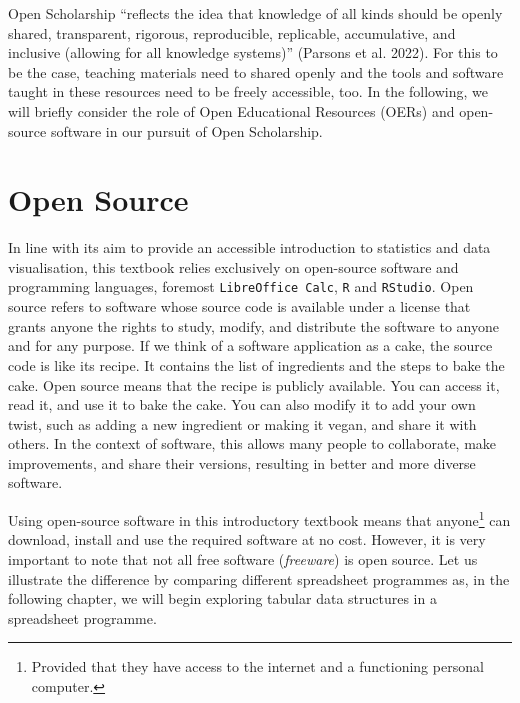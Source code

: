 \documentclass[
  letterpaper,
  DIV=11,
  numbers=noendperiod]{scrreprt}
\begin{document}
Open Scholarship ``reflects the idea that knowledge of all kinds should
be openly shared, transparent, rigorous, reproducible, replicable,
accumulative, and inclusive (allowing for all knowledge systems)''
(Parsons et al. 2022). For this to be the case, teaching materials need
to shared openly and the tools and software taught in these resources
need to be freely accessible, too. In the following, we will briefly
consider the role of Open Educational Resources (OERs) and open-source
software in our pursuit of Open Scholarship.

\section{Open Source}\label{open-source}

In line with its aim to provide an accessible introduction to statistics
and data visualisation, this textbook relies exclusively on open-source
software and programming languages, foremost \texttt{LibreOffice\ Calc},
\texttt{R} and \texttt{RStudio}. Open source refers to software whose
source code is available under a license that grants anyone the rights
to study, modify, and distribute the software to anyone and for any
purpose. If we think of a software application as a cake, the source
code is like its recipe. It contains the list of ingredients and the
steps to bake the cake. Open source means that the recipe is publicly
available. You can access it, read it, and use it to bake the cake. You
can also modify it to add your own twist, such as adding a new
ingredient or making it vegan, and share it with others. In the context
of software, this allows many people to collaborate, make improvements,
and share their versions, resulting in better and more diverse software.

Using open-source software in this introductory textbook means that
anyone\footnote{Provided that they have access to the internet and a
  functioning personal computer.} can download, install and use the
required software at no cost. However, it is very important to note that
not all free software (\emph{freeware}) is open source. Let us
illustrate the difference by comparing different spreadsheet programmes
as, in the following chapter, we will begin exploring tabular data
structures in a spreadsheet programme.
\end{document}
